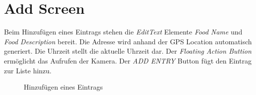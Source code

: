 \documentclass[
    DIV12,
    cleardouble=plain,
    headings=normal,
    pdftex,
    headexclude,footexclude,
    final
]{scrreprt}
\begin{document}
\section{Add Screen}
Beim Hinzufügen eines Eintrags stehen die \textit{EditText} Elemente \textit{Food Name} und \textit{Food Description} bereit. Die Adresse wird anhand der GPS Location automatisch generiert. Die Uhrzeit stellt die aktuelle Uhrzeit dar. Der \textit{Floating Action Buttion} ermöglicht das Aufrufen der Kamera. Der \textit{ADD ENTRY} Button fügt den Eintrag zur Liste hinzu.
\begin{figure}[H]
	\centering
	\caption{Hinzufügen eines Eintrags}
	\label{addScreen}
\end{figure}



\newpage
\end{document}
